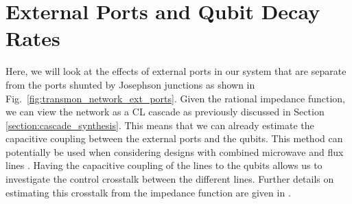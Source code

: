 
\section{External Ports and Qubit Decay Rates}\label{section:ext_ports_decay}
Here, we will look at the effects of external ports in our system that are separate from the ports shunted by Josephson junctions as shown in Fig.\ \ref{fig:transmon_network_ext_ports}. Given the rational impedance function, we can view the network as a CL cascade as previously discussed in Section \ref{section:cascade_synthesis}. This means that we can already estimate the capacitive coupling between the external ports and the qubits. This method can potentially be used when considering designs with combined microwave and flux lines \cite{combined_xyz_line,karamlou2023probing,Moskalenko2022}. Having the capacitive coupling of the lines to the qubits allows us to investigate the control crosstalk between the different lines. Further details on estimating this crosstalk from the impedance function are given in \cite{solgun_sirf,sherbrooke_sirf}.

